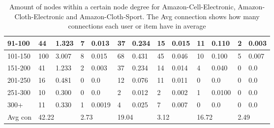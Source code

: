 \begin{table*}[]
\begin{tabular}{|l|l|l|l|l|l|l|l|l|l|l|l|l|}
        91-100  & 44                                          & 1.323                                        & 7                                       & 0.013                      & 37                         & 0.234                      & 15    & 0.015 & 11   & 0.110  & 2     & 0.003 \\ \hline
        101-150 & 100                                         & 3.007                                        & 8                                       & 0.015                      & 68                         & 0.431                      & 45    & 0.046 & 10   & 0.100  & 5     & 0.007 \\ \hline
        151-200 & 41                                          & 1.233                                        & 2                                       & 0.003                      & 37                         & 0.234                      & 14    & 0.014 & 4    & 0.040  & 0     & 0.0   \\ \hline
        201-250 & 16                                          & 0.481                                        & 0                                       & 0.0                        & 12                         & 0.076                      & 11    & 0.011 & 0    & 0.0    & 0     & 0.0   \\ \hline
        251-300 & 10                                          & 0.300                                        & 0                                       & 0.0                        & 2                          & 0.012                      & 2     & 0.002 & 1    & 0.0100 & 0     & 0.0   \\ \hline
        300+    & 11                                          & 0.330                                        & 1                                       & 0.0019                     & 4                          & 0.025                      & 7     & 0.007 & 0    & 0.0    & 0     & 0.0   \\ \hline
        Avg con & \multicolumn{2}{l|}{42.22}                  & \multicolumn{2}{l|}{2.73}                    & \multicolumn{2}{l|}{19.04}              & \multicolumn{2}{l|}{3.12}  & \multicolumn{2}{l|}{16.72} & \multicolumn{2}{l|}{2.49}                                                  \\ \hline
    \end{tabular}
    \caption{Amount of nodes within a certain node degree for Amazon-Cell-Electronic, Amazon-Cloth-Electronic and Amazon-Cloth-Sport. The Avg connection shows how many connections each user or item have in average}
    \label{tab:node-degrees-cell-sport-electronic}
\end{table*}

